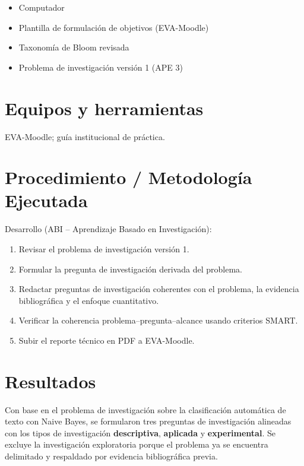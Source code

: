 \documentclass[11pt,a4paper]{article}
\begin{document}
\begin{itemize}[leftmargin=1.2cm,itemsep=0.2em]
  \item Computador
  \item Plantilla de formulación de objetivos (EVA-Moodle)
  \item Taxonomía de Bloom revisada
  \item Problema de investigación versión 1 (APE 3)
\end{itemize}

\section{Equipos y herramientas}

EVA-Moodle; guía institucional de práctica.

\section{Procedimiento / Metodología Ejecutada}

Desarrollo (ABI -- Aprendizaje Basado en Investigación):

\begin{enumerate}[leftmargin=1.2cm,itemsep=0.2em]
  \item Revisar el problema de investigación versión 1.
  \item Formular la pregunta de investigación derivada del problema.
  \item Redactar preguntas de investigación coherentes con el problema, la evidencia bibliográfica y el enfoque cuantitativo.
  \item Verificar la coherencia problema--pregunta--alcance usando criterios SMART.
  \item Subir el reporte técnico en PDF a EVA-Moodle.
\end{enumerate}

\section{Resultados}

Con base en el problema de investigación sobre la clasificación automática de texto con Naive Bayes, se formularon tres preguntas de investigación alineadas con los tipos de investigación \textbf{descriptiva}, \textbf{aplicada} y \textbf{experimental}. Se excluye la investigación exploratoria porque el problema ya se encuentra delimitado y respaldado por evidencia bibliográfica previa.
\end{document}
